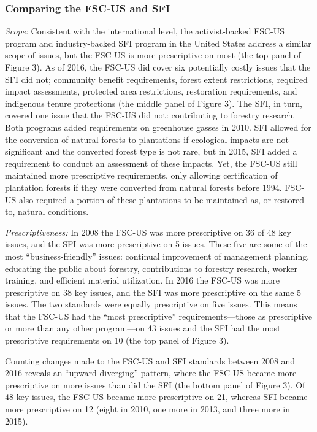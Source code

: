 \documentclass[
      12pt,
            Review ]{article}
\begin{document}
\hypertarget{comparing-the-fsc-us-and-sfi}{%
\subsubsection{Comparing the FSC-US and SFI}\label{comparing-the-fsc-us-and-sfi}}

\emph{Scope:} Consistent with the international level, the activist-backed FSC-US program and industry-backed SFI program in the United States address a similar scope of issues, but the FSC-US is more prescriptive on most (the top panel of Figure 3). As of 2016, the FSC-US did cover six potentially costly issues that the SFI did not; community benefit requirements, forest extent restrictions, required impact assessments, protected area restrictions, restoration requirements, and indigenous tenure protections (the middle panel of Figure 3). The SFI, in turn, covered one issue that the FSC-US did not: contributing to forestry research. Both programs added requirements on greenhouse gasses in 2010. SFI allowed for the conversion of natural forests to plantations if ecological impacts are not significant and the converted forest type is not rare, but in 2015, SFI added a requirement to conduct an assessment of these impacts. Yet, the FSC-US still maintained more prescriptive requirements, only allowing certification of plantation forests if they were converted from natural forests before 1994. FSC-US also required a portion of these plantations to be maintained as, or restored to, natural conditions.

\emph{Prescriptiveness:} In 2008 the FSC-US was more prescriptive on 36 of 48 key issues, and the SFI was more prescriptive on 5 issues. These five are some of the most ``business-friendly'' issues: continual improvement of management planning, educating the public about forestry, contributions to forestry research, worker training, and efficient material utilization. In 2016 the FSC-US was more prescriptive on 38 key issues, and the SFI was more prescriptive on the same 5 issues. The two standards were equally prescriptive on five issues. This means that the FSC-US had the ``most prescriptive'' requirements---those as prescriptive or more than any other program---on 43 issues and the SFI had the most prescriptive requirements on 10 (the top panel of Figure 3).

Counting changes made to the FSC-US and SFI standards between 2008 and 2016 reveals an ``upward diverging'' pattern, where the FSC-US became more prescriptive on more issues than did the SFI (the bottom panel of Figure 3). Of 48 key issues, the FSC-US became more prescriptive on 21, whereas SFI became more prescriptive on 12 (eight in 2010, one more in 2013, and three more in 2015).
\end{document}
